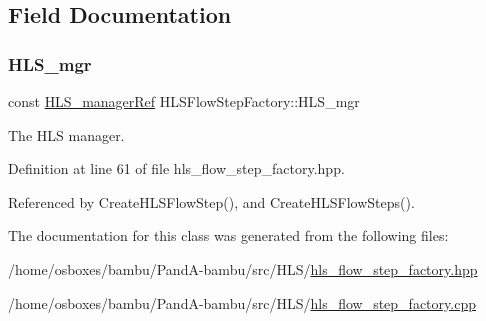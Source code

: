 \subsection{Field Documentation}
\mbox{\label{classHLSFlowStepFactory_aac24e2a560d49d1800fa8dddc37adb8a}} 
\subsubsection{\texorpdfstring{H\+L\+S\+\_\+mgr}{HLS\_mgr}}
{\footnotesize\ttfamily const \hyperlink{hls__manager_8hpp_acd3842b8589fe52c08fc0b2fcc813bfe}{H\+L\+S\+\_\+manager\+Ref} H\+L\+S\+Flow\+Step\+Factory\+::\+H\+L\+S\+\_\+mgr\hspace{0.3cm}{\ttfamily [protected]}}



The H\+LS manager. 



Definition at line 61 of file hls\+\_\+flow\+\_\+step\+\_\+factory.\+hpp.



Referenced by Create\+H\+L\+S\+Flow\+Step(), and Create\+H\+L\+S\+Flow\+Steps().



The documentation for this class was generated from the following files\+:\begin{DoxyCompactItemize}
\item 
/home/osboxes/bambu/\+Pand\+A-\/bambu/src/\+H\+L\+S/\hyperlink{hls__flow__step__factory_8hpp}{hls\+\_\+flow\+\_\+step\+\_\+factory.\+hpp}\item 
/home/osboxes/bambu/\+Pand\+A-\/bambu/src/\+H\+L\+S/\hyperlink{hls__flow__step__factory_8cpp}{hls\+\_\+flow\+\_\+step\+\_\+factory.\+cpp}\end{DoxyCompactItemize}
